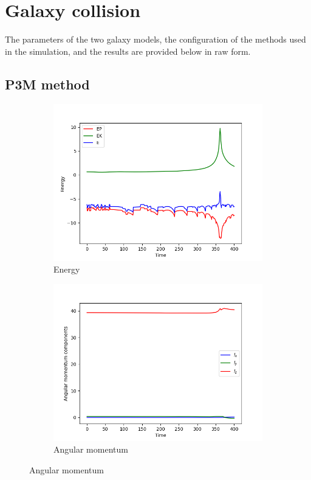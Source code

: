\section{Galaxy collision}
The parameters of the two galaxy models, the configuration of the methods used in the simulation, and the results are provided below in raw form.
\subsection{P3M method}
\begin{figure}[H]
    \centering
    \begin{subfigure}[b]{0.45\textwidth}
        \centering
        \includegraphics[width=\textwidth]{chapters/results/img/p3m-collision/energy.png}
        \caption{Energy}
        \label{fig:physical-quantities-p3m-collision-sub1}
    \end{subfigure}
    \hfill
    \begin{subfigure}[b]{0.45\textwidth}
        \centering
        \includegraphics[width=\textwidth]{chapters/results/img/p3m-collision/angular-momentum.png}
        \caption{Angular momentum}
        \label{fig:physical-quantities-p3m-collision-sub2}
    \end{subfigure}


\end{figure}

